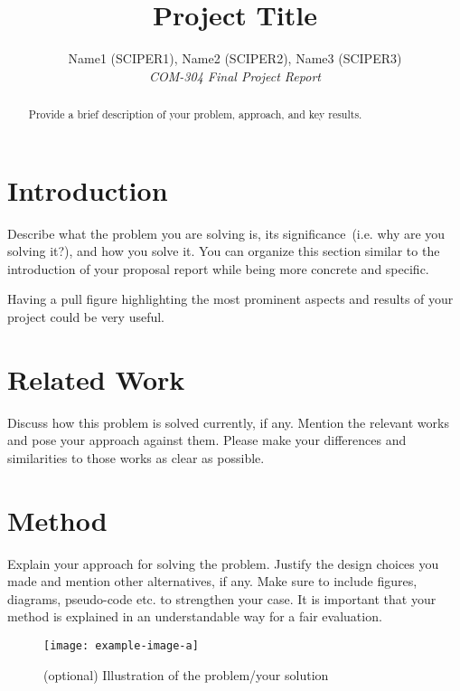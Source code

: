 \documentclass[10pt,conference,compsocconf]{IEEEtran}
\begin{document}
\title{Project Title}

\author{
  Name1 (SCIPER1), Name2 (SCIPER2), Name3 (SCIPER3)\\
  \textit{COM-304 Final Project Report}
}

\maketitle

\begin{abstract}
    Provide a brief description of your problem, approach, and key results.
\end{abstract}


\section{Introduction}

Describe what the problem you are solving is, its significance~(i.e. why are you solving it?), and how you solve it. You can organize this section similar to the introduction of your proposal report while being more concrete and specific.

Having a pull figure highlighting the most prominent aspects and results of your project could be very useful.

\section{Related Work}
Discuss how this problem is solved currently, if any. Mention the relevant works~\cite{example} and pose your approach against them. Please make your differences and similarities to those works as clear as possible.

\section{Method}

Explain your approach for solving the problem. Justify the design choices you made and mention other alternatives, if any. Make sure to include figures, diagrams, pseudo-code etc. to strengthen your case. It is important that your method is explained in an understandable way for a fair evaluation.

\begin{figure}[tbph]
  \centering
  \texttt{[image: example-image-a]}
  \caption{(optional) Illustration of the problem/your solution}
  \vspace{-3mm}
  \label{fig:placeholder1}
\end{figure}
\end{document}
